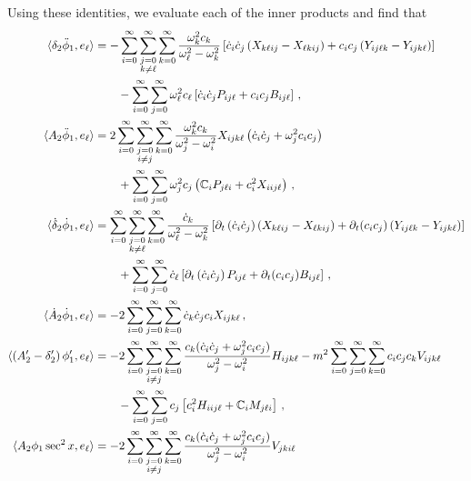 \documentclass[../PhD.tex]{subfiles}
\begin{document}
\begin{subappendices}
Using these identities, we evaluate each of the inner products and find that
\begin{align}
\label{inner prod 1}
\langle \delta_2 \ddot \phi_1, e_\ell \rangle &= - \sum_{i = 0}^\infty \sum_{\substack{j=0 \\ k \neq \ell}}^\infty \sum_{k=0}^\infty \frac{\ok^2 c_k}{\ol^2 - \ok^2} \left[\dot c_i \dot c_j \left(X_{k\ell ij} - X_{\ell k i j} \right) + c_i c_j \left( Y_{ij\ell k} - Y_{ijk\ell} \right) \right] \nonumber \\
& \qquad  - \sum_{i=0}^\infty \sum_{j=0}^\infty \ol^2 c_\ell \left[ \dot c_i \dot c_j P_{ij\ell} + c_i c_j B_{i j \ell} \right] \, , \\
%
\langle A_2 \ddot \phi_1, e_\ell \rangle &= 2 \sum_{i = 0}^\infty \sum_{\substack{j=0 \\ i \neq j}}^\infty \sum_{k=0}^\infty \frac{\ok^2 c_k}{\oj^2 - \oi^2} X_{ijk \ell} \left( \dot c_i \dot c_j + \oj^2 c_i c_j \right) \nonumber \\
& \qquad + \sum_{i = 0}^\infty \sum_{j = 0}^\infty \oj^2 c_j \left( \mathbb C_i P_{j \ell i} + c_i^2 X_{ii j \ell} \right) \, , \\
%
\langle \dot \delta_2 \dot \phi_1 , e_\ell \rangle &= \sum_{i = 0}^\infty \sum_{\substack{j=0 \\ k \neq \ell}}^\infty \sum_{k=0}^\infty \frac{\dot c_k}{\ol^2 - \ok^2} \left[ \p_t \left( \dot c_i \dot c_j \right) \left( X_{k\ell ij} - X_{\ell k i j} \right) + \p_t (c_i c_j) \left(Y_{ij\ell k} - Y_{ijk\ell}\right) \right] \nonumber \\
& \qquad+ \sum_{i=0}^\infty \sum_{j=0}^\infty \dot c_\ell \left[ \p_t \left( \dot c_i \dot c_j \right) P_{ij\ell} + \p_t (c_i c_j) B_{ij\ell} \right] \, , \\
%
\langle \dot A_2 \dot \phi_1, e_\ell \rangle &= -2 \sum_{i=0}^\infty \sum_{j=0}^\infty \sum_{k=0}^\infty  \dot c_k \dot c_j c_i X_{ijk\ell} \, , \\
%
\langle \left( A_2' - \delta_2' \right) \phi_1', e_\ell \rangle &= - 2 \sum_{i = 0}^\infty \sum_{\substack{j=0 \\ i \neq j}}^\infty \sum_{k=0}^\infty \frac{c_k (\dot c_i \dot c_j + \oj^2 c_i c_j)}{\oj^2 -\oi^2} H_{ijk\ell} -m^2 \sum_{i=0}^\infty \sum _{j=0}^\infty \sum_{k=0}^\infty c_i c_j c_k V_{ijk\ell} \nonumber \\
%
& \qquad - \sum_{i=0}^\infty \sum_{j=0}^\infty c_j \left[ c_i^2 H_{iij\ell} + \mathbb C_i M_{j \ell i} \right] \, , \\
%
\label{inner prod 2}
\langle A_2 \phi_1 \sec^2 x, e_\ell \rangle &= - 2\sum_{i = 0}^\infty \sum_{\substack{j=0 \\ i \neq j}}^\infty \sum_{k=0}^\infty \frac{c_k (\dot c_i \dot c_j + \oj^2 c_i c_j )}{\oj^2 - \oi^2} V_{jki\ell} \nonumber \\

\end{align}
\end{subappendices}
\end{document}
